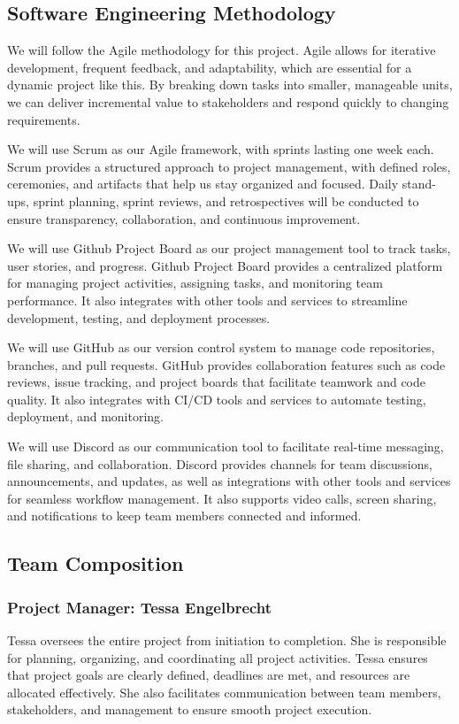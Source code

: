 \documentclass{article}
\begin{document}
\subsection{Software Engineering Methodology}
\begin{itemsize}
\item We will follow the Agile methodology for this project. Agile allows for iterative development, frequent feedback, and adaptability, which are essential for a dynamic project like this. By breaking down tasks into smaller, manageable units, we can deliver incremental value to stakeholders and respond quickly to changing requirements.
\item We will use Scrum as our Agile framework, with sprints lasting one week each. Scrum provides a structured approach to project management, with defined roles, ceremonies, and artifacts that help us stay organized and focused. Daily stand-ups, sprint planning, sprint reviews, and retrospectives will be conducted to ensure transparency, collaboration, and continuous improvement.
\item We will use Github Project Board as our project management tool to track tasks, user stories, and progress. Github Project Board provides a centralized platform for managing project activities, assigning tasks, and monitoring team performance. It also integrates with other tools and services to streamline development, testing, and deployment processes.
\item We will use GitHub as our version control system to manage code repositories, branches, and pull requests. GitHub provides collaboration features such as code reviews, issue tracking, and project boards that facilitate teamwork and code quality. It also integrates with CI/CD tools and services to automate testing, deployment, and monitoring.
\item We will use Discord as our communication tool to facilitate real-time messaging, file sharing, and collaboration. Discord provides channels for team discussions, announcements, and updates, as well as integrations with other tools and services for seamless workflow management. It also supports video calls, screen sharing, and notifications to keep team members connected and informed.
\subsection{Team Composition}
\subsubsection{Project Manager: Tessa Engelbrecht}
Tessa oversees the entire project from initiation to completion. She is responsible for planning, organizing, and coordinating all project activities. Tessa ensures that project goals are clearly defined, deadlines are met, and resources are allocated effectively. She also facilitates communication between team members, stakeholders, and management to ensure smooth project execution.

\end{itemsize}
\end{document}
